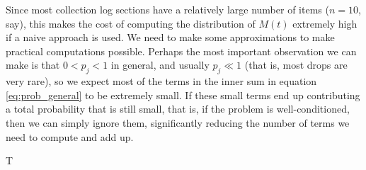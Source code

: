 \documentclass[letterpaper]{article}
\begin{document}
	Since most collection log sections have a relatively large number of items ($n = 10$, say), this makes the cost of computing the distribution of $M(t)$ extremely high if a naive approach is used. We need to make some approximations to make practical computations possible. Perhaps the most important observation we can make is that $0<p_j < 1$ in general, and usually $p_j \ll 1$ (that is, most drops are very rare), so we expect most of the terms in the inner sum in equation \eqref{eq:prob_general} to be extremely small. If these small terms end up contributing a total probability that is still small, that is, if the problem is well-conditioned, then we can simply ignore them, significantly reducing the number of terms we need to compute and add up.
	
	T
	 
\end{document}

